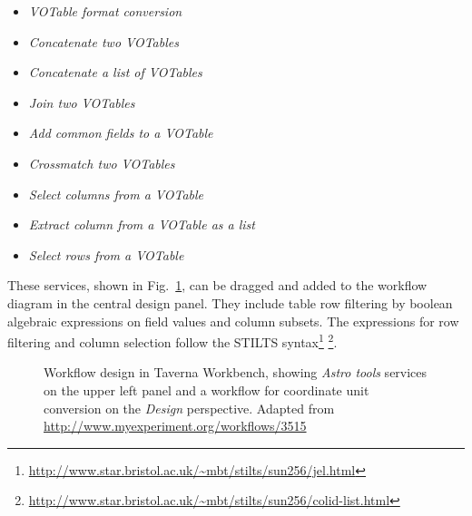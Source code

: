 \documentclass[final,authoryear,5p,times,twocolumn]{elsarticle}
\newcommand{\urlsamefont}[1]{\urlstyle{same}\url{#1}}
\begin{document}
\begin{itemize}
\item \textit{VOTable format conversion}
\item \textit{Concatenate two VOTables}
\item \textit{Concatenate a list of VOTables}
\item \textit{Join two VOTables}
\item \textit{Add common fields to a VOTable}
\item \textit{Crossmatch two VOTables}
\item \textit{Select columns from a VOTable}
\item \textit{Extract column from a VOTable as a list}
\item \textit{Select rows from a VOTable}
\end{itemize}

These services, shown in Fig.~\ref{fig:design}, can be dragged and added to the workflow diagram in the central design panel. They include table row filtering by boolean algebraic expressions on field values and column subsets.  The expressions for row filtering and column selection follow the STILTS syntax\footnote{\urlsamefont{http://www.star.bristol.ac.uk/~mbt/stilts/sun256/jel.html}} \footnote{\urlsamefont{http://www.star.bristol.ac.uk/~mbt/stilts/sun256/colid-list.html}}.

\begin{figure}[tb]
\centering 
{}
\caption{Workflow design in Taverna Workbench, showing \textit{Astro tools} services on the upper left panel and a workflow for coordinate unit conversion on the \emph{Design} perspective. Adapted from \url{http://www.myexperiment.org/workflows/3515}}
\label{fig:design}
\end{figure}
\end{document}
